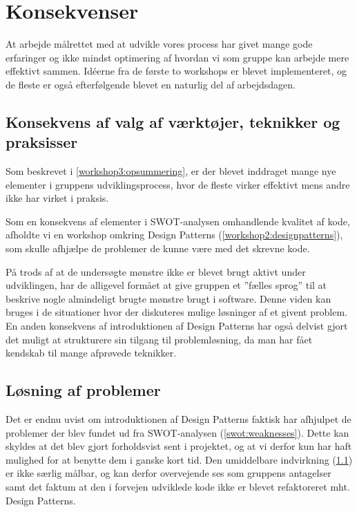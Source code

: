 \section{Konsekvenser}\label{konsekvenser}
At arbejde målrettet med at udvikle vores process har givet mange gode erfaringer og ikke mindst optimering af hvordan vi som gruppe kan arbejde mere effektivt sammen.
Idéerne fra de første to workshops er blevet implementeret, og de fleste er også efterfølgende blevet en naturlig del af arbejdsdagen.

\subsection{Konsekvens af valg af værktøjer, teknikker og praksisser}\label{konsekvens:valg}
Som beskrevet i \cref{workshop3:opsummering}, er der blevet inddraget mange nye elementer i gruppens udviklingsprocess, hvor de fleste virker effektivt mens andre ikke har virket i praksis.

Som en konsekvens af elementer i SWOT-analysen omhandlende kvalitet af kode, afholdte vi en workshop omkring Design Patterns (\cref{workshop2:designpatterns}), som skulle afhjælpe de problemer de kunne være med det skrevne kode.

På trods af at de undersøgte mønstre ikke er blevet brugt aktivt under udviklingen, har de alligevel formået at give
 gruppen et ''fælles sprog'' til at beskrive nogle almindeligt brugte mønstre brugt i software.
Denne viden kan bruges i de situationer hvor der diskuteres mulige løsninger af et givent problem.
En anden konsekvens af introduktionen af Design Patterns har også delvist gjort det muligt at strukturere sin tilgang til problemløsning, da man har fået kendskab til mange afprøvede teknikker.

\subsection{Løsning af problemer}\label{konsekvens:problemer}
Det er endnu uvist om introduktionen af Design Patterns faktisk har afhjulpet de problemer der blev fundet ud fra SWOT-analysen (\cref{swot:weaknesses}).
Dette kan skyldes at det blev gjort forholdsvist sent i projektet, og at vi derfor kun har haft mulighed for at benytte dem i ganske kort tid.
Den umiddelbare indvirkning (\cref{konsekvens:valg}) er ikke særlig målbar, og kan derfor overvejende ses som gruppens antagelser samt det faktum at den i forvejen udviklede kode ikke er blevet refaktoreret mht. Design Patterns.

